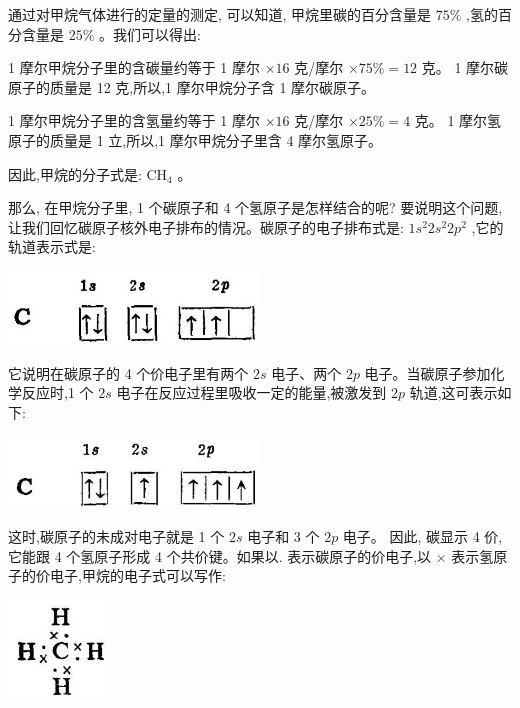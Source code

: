 \documentclass[10pt]{article}
\begin{document}
通过对甲烷气体进行的定量的测定, 可以知道, 甲烷里碳的百分含量是 \({75}\%\) ,氢的百分含量是 \({25}\%\) 。我们可以得出:

1 摩尔甲烷分子里的含碳量约等于 1 摩尔 \(\times {16}\) 克/摩尔 \(\times {75}\% = {12}\) 克。 1 摩尔碳原子的质量是 12 克,所以,1 摩尔甲烷分子含 1 摩尔碳原子。

1 摩尔甲烷分子里的含氢量约等于 1 摩尔 \(\times {16}\) 克/摩尔 \(\times {25}\% = 4\) 克。 1 摩尔氢原子的质量是 1 立,所以,1 摩尔甲烷分子里含 4 摩尔氢原子。

因此,甲烷的分子式是: \({\mathrm{{CH}}}_{4}\) 。

那么, 在甲烷分子里, 1 个碳原子和 4 个氢原子是怎样结合的呢? 要说明这个问题, 让我们回忆碳原子核外电子排布的情况。碳原子的电子排布式是: \(1{s}^{2}2{s}^{2}2{p}^{2}\) ,它的轨道表示式是:

\begin{center}
\includegraphics[max width=0.5\textwidth]{images/01912d16-be99-77bb-9535-4f3ed8d9946f_51_351595.jpg}
\end{center}

它说明在碳原子的 4 个价电子里有两个 \({2s}\) 电子、两个 \({2p}\) 电子。当碳原子参加化学反应时,1 个 \({2s}\) 电子在反应过程里吸收一定的能量,被激发到 \({2p}\) 轨道,这可表示如下:

\begin{center}
\includegraphics[max width=0.5\textwidth]{images/01912d16-be99-77bb-9535-4f3ed8d9946f_51_924448.jpg}
\end{center}

这时,碳原子的未成对电子就是 1 个 \({2s}\) 电子和 3 个 \({2p}\) 电子。 因此, 碳显示 4 价, 它能跟 4 个氢原子形成 4 个共价键。如果以. 表示碳原子的价电子,以 \(\times\) 表示氢原子的价电子,甲烷的电子式可以写作:

\begin{center}
\includegraphics[max width=0.2\textwidth]{images/01912d16-be99-77bb-9535-4f3ed8d9946f_51_747828.jpg}
\end{center}
\end{document}
